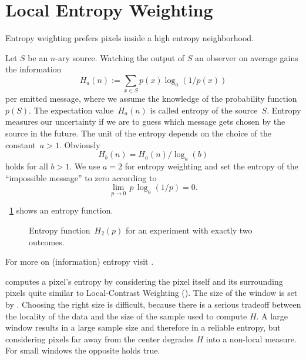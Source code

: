 

\section[Local Entropy Weighting]{\label{sec:local-entropy-weighting}%
  Local Entropy Weighting}

Entropy weighting prefers pixels inside a high entropy neighborhood.

Let $S$ be an $n$-ary source.  Watching the output of $S$ an observer
on average gains the information
\[
    H_a(n) := \sum_{x \in S} p(x) \log_a(1 / p(x))
\]
\noindent per emitted message, where we assume the knowledge of the probability function~$p(S)$.
The expectation value~$H_a(n)$ is called entropy of the source~$S$.  Entropy measures our
uncertainty if we are to guess which message gets chosen by the source in the future.  The unit
of the entropy depends on the choice of the constant~$a > 1$.  Obviously
\[
    H_b(n) = H_a(n) / \log_a(b)
\]
\noindent holds for all $b > 1$.  We use $a = 2$ for entropy weighting and set the entropy of
the ``impossible message'' to zero according to
\[
    \lim_{p \rightarrow 0} \, p \, \log_a(1 / p) = 0.
\]

\figureName~\ref{fig:entropy} shows an entropy function.


\begin{figure}
  \ifreferencemanual\begin{maxipage}\fi
  \centering
  \ifreferencemanual\end{maxipage}\fi

  \caption[Entropy function]{\label{fig:entropy}%
    Entropy function~$H_2(p)$ for an experiment with exactly two outcomes.}
\end{figure}


For more on (information) entropy visit .

%
\App{} computes a pixel's entropy by considering the pixel itself and its surrounding pixels
quite similar to Local-Contrast Weighting ().  The size of
the window is set by .  Choosing the right size is difficult,
because there is a serious tradeoff between the locality of the data and the size of the sample
used to compute $H$.  A large window results in a large sample size and therefore in a reliable
entropy, but considering pixels far away from the center degrades $H$ into a non-local measure.
For small windows the opposite holds true.

